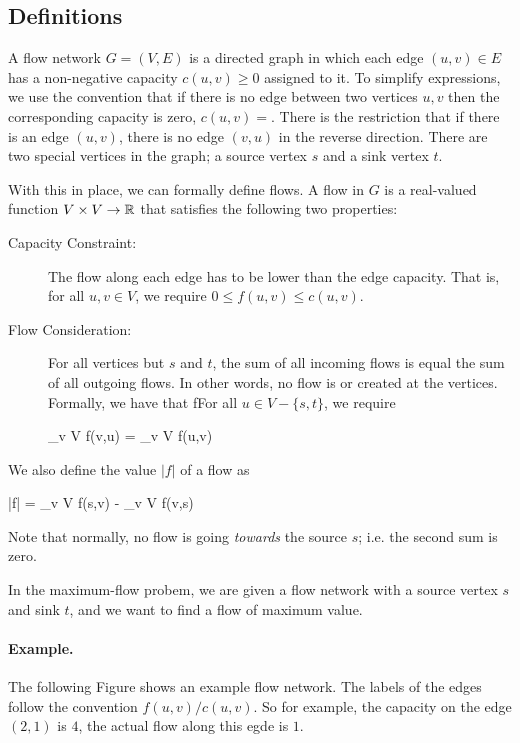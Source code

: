 
\subsection{Definitions}

A flow network $G = (V,E)$ is a directed graph in which each edge $(u,v) \in E$ has a non-negative capacity $c(u,v) \geq 0$ assigned to it. To simplify expressions, we use the convention that if there is no edge between two vertices $u,v$ then the corresponding capacity is zero, $c(u,v) = $. There is the restriction that if there is an edge $(u,v)$, there is no edge $(v,u)$ in the reverse direction. There are two special vertices in the graph; a source vertex $s$ and a sink vertex $t$.

With this in place, we can formally define flows. A flow in $G$ is a real-valued function $V \times V \rightarrow \mathbb{R}$ that satisfies the following two properties:

\begin{description}
\item [Capacity Constraint:] The flow along each edge has to be lower than the edge capacity. That is, for all $u,v \in V$, we require $0 \leq f(u,v) \leq c(u,v)$.
\item [Flow Consideration:] For all vertices but $s$ and $t$, the sum of all incoming flows is equal the sum of all outgoing flows. In other words, no flow is or created at the vertices. Formally, we have that fFor all $u \in V - \{s,t\}$, we require

\bee
\sum_{v \in V} f(v,u) = \sum_{v \in V} f(u,v)
\eee

\end{description}

We also define the value $|f|$ of a flow as

\bee
|f| = \sum_{v \in V} f(s,v) - \sum_{v \in V} f(v,s)
\eee

Note that normally, no flow is going \emph{towards} the source $s$; i.e. the second sum is zero.

In the maximum-flow probem, we are given a flow network with a source vertex $s$ and sink $t$, and we want to find a flow of maximum value.

\paragraph{Example.} The following Figure shows an example flow network. The labels of the edges follow the convention $f(u,v)/c(u,v)$. So for example, the capacity on the edge $(2,1)$ is $4$, the actual flow along this egde is $1$. 

